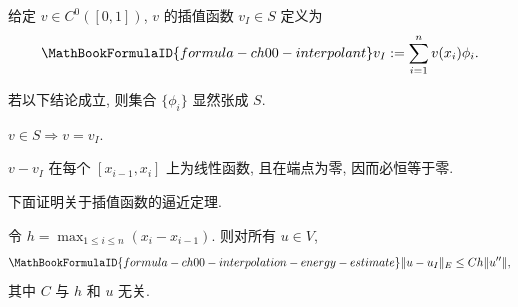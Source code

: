 \setcounter{thmcount}{2}
\begin{Definition}
\label{def:ch00-interpolant}
给定 $v\in C^0([0,1])$, $v$ 的插值函数 $v_I\in S$ 定义为
\[
\MathBookFormulaID{formula-ch00-interpolant}
v_I:=\sum_{i=1}^nv(x_i)\phi_i.
\]
\end{Definition}

若以下结论成立, 则集合 $\{\phi_i\}$ 显然张成 $S$.

\setcounter{thmcount}{3}
\begin{Lemma}
\label{lem:ch00-interpolant-projection}
$v\in S\Rightarrow v=v_I$.
\end{Lemma}

\begin{Proof}
$v-v_I$ 在每个 $[x_{i-1},x_i]$ 上为线性函数, 且在端点为零, 因而必恒等于零.
\end{Proof}

下面证明关于插值函数的逼近定理.

\setcounter{thmcount}{4}
\begin{Theorem}
\label{thm:ch00-interpolation-energy-estimate}
令 $h=\max_{1\leq i\leq n}(x_i-x_{i-1})$. 则对所有 $u\in V$,
\[
\MathBookFormulaID{formula-ch00-interpolation-energy-estimate}
\|u-u_I\|_E\leq Ch\|u''\|,
\]
其中 $C$ 与 $h$ 和 $u$ 无关.
\end{Theorem}

